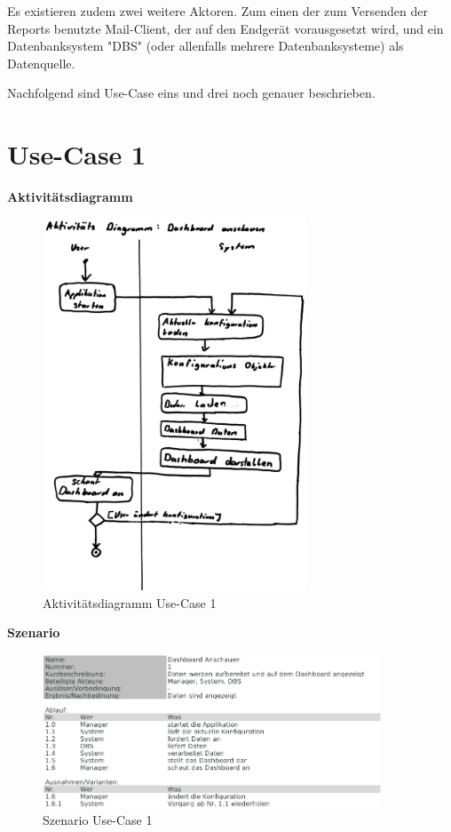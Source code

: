 \documentclass[a4paper]{scrreprt}
\begin{document}
Es existieren zudem zwei weitere Aktoren. Zum einen der zum Versenden der Reports benutzte Mail-Client, der auf den Endgerät vorausgesetzt wird, und ein Datenbanksystem "DBS" (oder allenfalls mehrere Datenbanksysteme) als Datenquelle.

\bigskip

Nachfolgend sind Use-Case eins und drei noch genauer beschrieben.


\pagebreak

\section{Use-Case 1}
\textbf{Aktivitätsdiagramm}

\begin{figure}[htbp]
\includegraphics[width=0.7\textwidth]{uc-1_Dashboard/uc1_activity.jpg}
\caption[Aktivitätsdiagramm Use-Case 1]{Aktivitätsdiagramm Use-Case 1}
\end{figure}

\pagebreak


\textbf{Szenario}

\begin{figure}[htbp]
\includegraphics[width=0.9\textwidth]{uc-1_Dashboard/uc1_scenario.png}
\caption[Szenario Use-Case 1]{Szenario Use-Case 1}
\end{figure}
\end{document}
